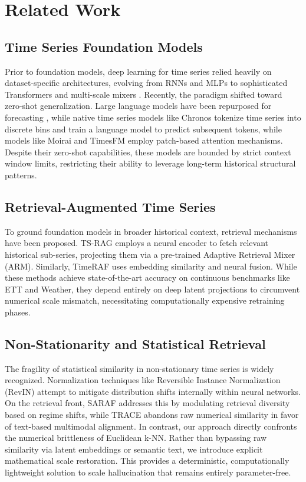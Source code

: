 \section{Related Work}
\label{sec:related_work}

\subsection{Time Series Foundation Models}
Prior to foundation models, deep learning for time series relied heavily on dataset-specific architectures, evolving from RNNs \cite{deepar} and MLPs \cite{nbeats} to sophisticated Transformers \cite{informer,autoformer,patchtst,itransformer} and multi-scale mixers \cite{timesnet,timemixer}. Recently, the paradigm shifted toward zero-shot generalization. Large language models have been repurposed for forecasting \cite{llmtime,timellm}, while native time series models like Chronos \cite{chronos} tokenize time series into discrete bins and train a language model to predict subsequent tokens, while models like Moirai \cite{moirai} and TimesFM \cite{timesfm} employ patch-based attention mechanisms. Despite their zero-shot capabilities, these models are bounded by strict context window limits, restricting their ability to leverage long-term historical structural patterns.

\subsection{Retrieval-Augmented Time Series}
To ground foundation models in broader historical context, retrieval mechanisms have been proposed. TS-RAG \cite{tsrag} employs a neural encoder to fetch relevant historical sub-series, projecting them via a pre-trained Adaptive Retrieval Mixer (ARM). Similarly, TimeRAF \cite{timeraf} uses embedding similarity and neural fusion. While these methods achieve state-of-the-art accuracy on continuous benchmarks like ETT and Weather, they depend entirely on deep latent projections to circumvent numerical scale mismatch, necessitating computationally expensive retraining phases.

\subsection{Non-Stationarity and Statistical Retrieval}
The fragility of statistical similarity in non-stationary time series is widely recognized. Normalization techniques like Reversible Instance Normalization (RevIN) \cite{revin} attempt to mitigate distribution shifts internally within neural networks. On the retrieval front, SARAF \cite{saraf} addresses this by modulating retrieval diversity based on regime shifts, while TRACE \cite{trace} abandons raw numerical similarity in favor of text-based multimodal alignment. In contrast, our approach directly confronts the numerical brittleness of Euclidean k-NN. Rather than bypassing raw similarity via latent embeddings or semantic text, we introduce explicit mathematical scale restoration. This provides a deterministic, computationally lightweight solution to scale hallucination that remains entirely parameter-free.
